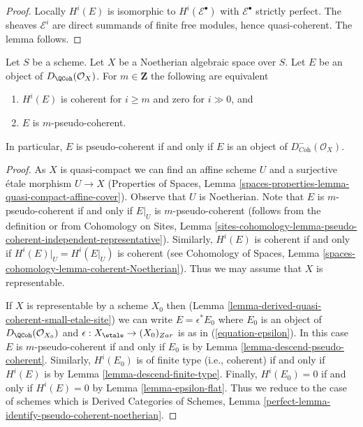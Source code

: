 \begin{proof}
Locally $H^i(E)$ is isomorphic to $H^i(\mathcal{E}^\bullet)$
with $\mathcal{E}^\bullet$ strictly perfect. The sheaves
$\mathcal{E}^i$ are direct summands of finite free modules,
hence quasi-coherent. The lemma follows.
\end{proof}

\begin{lemma}
\label{lemma-identify-pseudo-coherent-noetherian}
Let $S$ be a scheme. Let $X$ be a Noetherian algebraic space over $S$.
Let $E$ be an object of $D_\QCoh(\mathcal{O}_X)$. For
$m \in \mathbf{Z}$ the following are equivalent
\begin{enumerate}
\item $H^i(E)$ is coherent for $i \geq m$ and zero for $i \gg 0$, and
\item $E$ is $m$-pseudo-coherent.
\end{enumerate}
In particular, $E$ is pseudo-coherent if and only if $E$ is an object
of $D^-_{\textit{Coh}}(\mathcal{O}_X)$.
\end{lemma}

\begin{proof}
As $X$ is quasi-compact we can find an affine scheme $U$ and a surjective
\'etale morphism $U \to X$ (Properties of Spaces, Lemma
\ref{spaces-properties-lemma-quasi-compact-affine-cover}).
Observe that $U$ is Noetherian.
Note that $E$ is $m$-pseudo-coherent if and only if $E|_U$ is
$m$-pseudo-coherent (follows from the definition or from
Cohomology on Sites, Lemma
\ref{sites-cohomology-lemma-pseudo-coherent-independent-representative}).
Similarly, $H^i(E)$ is coherent if and only if $H^i(E)|_U = H^i(E|_U)$
is coherent (see Cohomology of Spaces, Lemma
\ref{spaces-cohomology-lemma-coherent-Noetherian}).
Thus we may assume that $X$ is representable.

\medskip\noindent
If $X$ is representable by a scheme $X_0$ then
(Lemma \ref{lemma-derived-quasi-coherent-small-etale-site})
we can write $E = \epsilon^*E_0$ where $E_0$ is an object of
$D_\QCoh(\mathcal{O}_{X_0})$ and
$\epsilon : X_\etale \to (X_0)_{Zar}$ is as in
(\ref{equation-epsilon}).
In this case $E$ is $m$-pseudo-coherent
if and only if $E_0$ is by Lemma \ref{lemma-descend-pseudo-coherent}.
Similarly, $H^i(E_0)$ is of finite type (i.e., coherent) if and only if
$H^i(E)$ is by Lemma \ref{lemma-descend-finite-type}.
Finally, $H^i(E_0) = 0$ if and only if $H^i(E) = 0$ by
Lemma \ref{lemma-epsilon-flat}.
Thus we reduce to the case of schemes which is
Derived Categories of Schemes, Lemma
\ref{perfect-lemma-identify-pseudo-coherent-noetherian}.
\end{proof}

